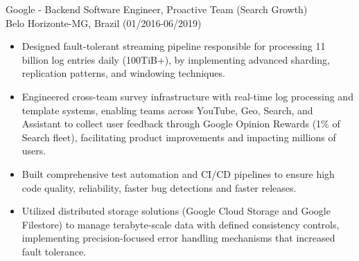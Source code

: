 
\normalsize{Google - Backend Software Engineer, Proactive Team (Search Growth)}\\
        \scriptsize{Belo Horizonte-MG, Brazil (01/2016-06/2019)}
\begin{itemize}
    \item \scriptsize{Designed fault-tolerant streaming pipeline responsible for processing 11 billion
        log entries daily (100TiB+), by implementing advanced sharding, replication patterns, and windowing techniques.}

    \item \scriptsize{Engineered cross-team survey infrastructure with real-time log processing and
        template systems, enabling teams across YouTube, Geo, Search, and Assistant to collect user 
        feedback through Google Opinion Rewards (1\% of Search fleet), facilitating product improvements
        and impacting millions of users.}

    \item \scriptsize{Built comprehensive test automation and CI/CD pipelines to ensure high code 
        quality, reliability, faster bug detections and faster releases.}

    \item \scriptsize{Utilized distributed storage solutions (Google Cloud Storage and Google Filestore)
        to manage terabyte-scale data with defined consistency controls, implementing precision-focused
        error handling mechanisms that increased fault tolerance.}
\end{itemize}